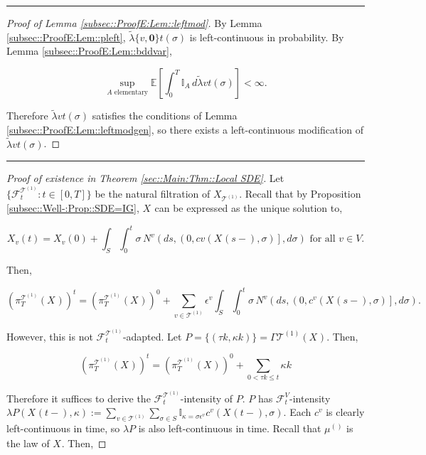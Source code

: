 \documentclass[12pt]{article}
\newcommand{\mb}{\mathbb}
\newcommand{\mc}{\mathcal}
\newcommand{\te}{\text}
\newcommand{\ep}{\epsilon}
\newcommand{\lin}{\rule{\linewidth}{0.4 pt}}
\newcommand{\ex}[1]{\mb{E}\left[#1\right]}			%
\renewcommand{\root}{\mathbf{0}}				%
\renewcommand{\v}{v}							%
\renewcommand{\S}{S}							%
\newcommand{\s}{\sigma}							%
\newcommand{\ev}{\ep}							%
\newcommand{\T}{T}								%
\renewcommand{\t}{t}							%
\newcommand{\proj}{\pi}							%
\renewcommand{\tt}{s}							%
\newcommand{\F}{\mc{F}}							%
\newcommand{\X}{X}								%
\newcommand{\IGr}{c}							%
\newcommand{\vind}[1]{^{#1}}					%
\newcommand{\vsi}[1]{^{#1}}						%
\newcommand{\cind}[1]{_{#1}}					%
\newcommand{\tp}[1]{(#1)}						%
\newcommand{\tip}[1]{#1}						%
\newcommand{\ts}[1]{_{#1}}						%
\newcommand{\tree}{\mc{T}}						%
\newcommand{\sln}[1]{^{(#1)}}						%
\newcommand{\poiss}{N}							%
\newcommand{\rate}{\lambda}						%
\newcommand{\alt}[1]{\widetilde{#1}}			%
\newcommand{\m}{\mu}							%
\newcommand{\rt}{\tau}							%
\renewcommand{\it}{k}							%
\newcommand{\pmap}{\Gamma}						%
\renewcommand{\mark}{\kappa}					%
\newcommand{\rp}{P}								%
\newcommand{\typset}{A}							%
\newcommand{\crate}{\alt{\lambda}}				%
\begin{document}
\lin

\begin{proof}[Proof of Lemma \ref{subsec::ProofE:Lem::leftmod}]

By Lemma \ref{subsec::ProofE:Lem::pleft}, \(\crate{\{\v,\root\}}{\t}(\s)\) is left-continuous in probability. By Lemma \ref{subsec::ProofE:Lem::bddvar},

\[\sup_{\typset\te{ elementary}} \ex{\int_0^\T \mb{I}_{\typset}\,d\crate{\v}{\t}(\s)} < \infty.\]

Therefore \(\crate{\v}{\t}(\s)\) satisfies the conditions of Lemma \ref{subsec::ProofE:Lem::leftmodgen}, so there exists a left-continuous modification of \(\crate{\v}{\t}(\s)\).
\end{proof}

\lin

\begin{proof}[Proof of existence in Theorem \ref{sec::Main:Thm::Local SDE}]

Let \(\{\F\vsi{\tree\sln{1}}\ts{\t}:\t\in [0,\T]\}\) be the natural filtration of \(\X\cind{\tree\sln{1}}\tip{}\). Recall that by Proposition \ref{subsec::Well-:Prop::SDE=IG}, \(\X\cind{}\tip{}\) can be expressed as the unique solution to,

\[\X\cind{\v}\tp{\t} = \X\cind{\v}\tp{0} + \int_\S\int_0^\t \s\,\poiss\vind{\v}\left(d\tt,\left(0,c{\v}(\X\cind{}\tp{\tt-},\s)\right],d\s\right) \te{ for all } \v \in V.\]

Then,

\[\left(\proj\vsi{\tree\sln{1}}\ts{\T}(\X\cind{}\tip{})\right)^\t = \left(\proj\vsi{\tree\sln{1}}\ts{\T}(\X\cind{}\tip{})\right)^0 + \sum_{\v \in \tree\sln{1}}\ev\vind{\v}\int_\S\int_0^\t \s\,\poiss\vind{\v}\left(d\tt,\left(0,\IGr\vind{\v}(\X\cind{}\tp{\tt-},\s)\right],d\s\right).\]

However, this is not \(\F\vsi{\tree\sln{1}}\ts{\t}\)-adapted. Let \(\rp{} = \{(\rt{\it},\mark{\it})\} = \pmap{\tree\sln{1}}(\X\cind{}\tip{}).\) Then,

\[\left(\proj\vsi{\tree\sln{1}}\ts{\T}(\X\cind{}\tip{})\right)^\t = \left(\proj\vsi{\tree\sln{1}}\ts{\T}(\X\cind{}\tip{})\right)^0 + \sum_{0 < \rt{\it} \leq \t}\mark{\it}\]

Therefore it suffices to derive the \(\F\vsi{\tree\sln{1}}\ts{\t}\)-intensity of \(\rp{}\). \(\rp{}\) has \(\F\vsi{V}\ts{\t}\)-intensity \(\rate{\rp{}}(\X\cind{}\tp{\t-},\mark{}) := \sum_{\v \in \tree\sln{1}}\sum_{\s\in \S}\mb{I}_{\mark{} = \s\ev\vind{\v}}\IGr\vind{\v}(\X\cind{}\tp{\t-},\s)\). Each \(\IGr\vind{\v}\) is clearly left-continuous in time, so \(\rate{\rp{}}\) is also left-continuous in time. Recall that \(\m\sln{}\ts{}\) is the law of \(\X\cind{}\tip{}\). Then,


\end{proof}
\end{document}
